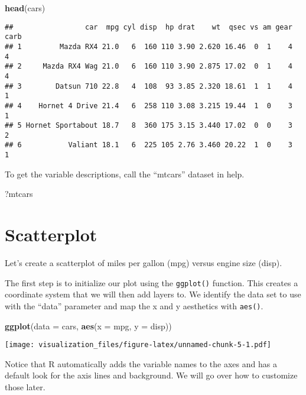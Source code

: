 \documentclass[oneside]{memoir}
\newenvironment{Shaded}{\begin{snugshade}}{\end{snugshade}}
\newcommand{\KeywordTok}[1]{\textcolor[rgb]{0.13,0.29,0.53}{\textbf{#1}}}
\newcommand{\DataTypeTok}[1]{\textcolor[rgb]{0.13,0.29,0.53}{#1}}
\newcommand{\NormalTok}[1]{#1}
\theoremstyle{definition}
\theoremstyle{definition}
\theoremstyle{definition}
\theoremstyle{remark}
\begin{document}
\begin{Shaded}
\begin{Highlighting}[]
\KeywordTok{head}\NormalTok{(cars)}
\end{Highlighting}
\end{Shaded}

\begin{verbatim}
##                 car  mpg cyl disp  hp drat    wt  qsec vs am gear carb
## 1         Mazda RX4 21.0   6  160 110 3.90 2.620 16.46  0  1    4    4
## 2     Mazda RX4 Wag 21.0   6  160 110 3.90 2.875 17.02  0  1    4    4
## 3        Datsun 710 22.8   4  108  93 3.85 2.320 18.61  1  1    4    1
## 4    Hornet 4 Drive 21.4   6  258 110 3.08 3.215 19.44  1  0    3    1
## 5 Hornet Sportabout 18.7   8  360 175 3.15 3.440 17.02  0  0    3    2
## 6           Valiant 18.1   6  225 105 2.76 3.460 20.22  1  0    3    1
\end{verbatim}

To get the variable descriptions, call the ``mtcars'' dataset in help.

\begin{Shaded}
\begin{Highlighting}[]
\NormalTok{?mtcars}
\end{Highlighting}
\end{Shaded}

\section{Scatterplot}\label{scatterplot}

Let's create a scatterplot of miles per gallon (mpg) versus engine size
(disp).

The first step is to initialize our plot using the \texttt{ggplot()}
function. This creates a coordinate system that we will then add layers
to. We identify the data set to use with the ``data'' parameter and map
the x and y aesthetics with \texttt{aes()}.

\begin{Shaded}
\begin{Highlighting}[]
\KeywordTok{ggplot}\NormalTok{(}\DataTypeTok{data =}\NormalTok{ cars, }\KeywordTok{aes}\NormalTok{(}\DataTypeTok{x =}\NormalTok{ mpg, }\DataTypeTok{y =}\NormalTok{ disp))}
\end{Highlighting}
\end{Shaded}

\texttt{[image: visualization\_files/figure-latex/unnamed-chunk-5-1.pdf]}

Notice that R automatically adds the variable names to the axes and has
a default look for the axis lines and background. We will go over how to
customize those later.
\end{document}
